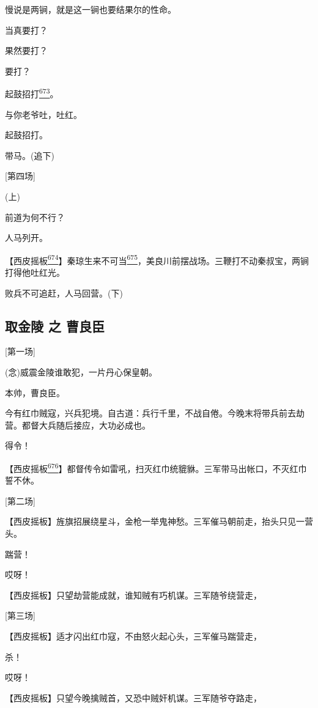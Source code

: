 慢说是两锏，就是这一锏也要结果尔的性命。

当真要打？

果然要打？

要打？

起鼓招打\protect\hyperlink{fn673}{\textsuperscript{673}}。

与你老爷吐，吐红。

起鼓招打。

带马。(追下)

{[}第四场{]}

(上)

前道为何不行？

人马列开。

【西皮摇板\protect\hyperlink{fn674}{\textsuperscript{674}}】秦琼生来不可当\protect\hyperlink{fn675}{\textsuperscript{675}}，美良川前摆战场。三鞭打不动秦叔宝，两锏打得他吐红光。

败兵不可追赶，人马回营。(下)

\newpage
\hypertarget{ux53d6ux91d1ux9675-ux4e4b-ux66f9ux826fux81e3}{%
\subsection{取金陵 之
曹良臣}\label{ux53d6ux91d1ux9675-ux4e4b-ux66f9ux826fux81e3}}

{[}第一场{]}

(念)威震金陵谁敢犯，一片丹心保皇朝。

本帅，曹良臣。

今有红巾贼寇，兴兵犯境。自古道：兵行千里，不战自倦。今晚末将带兵前去劫营。都督大兵随后接应，大功必成也。

得令！

【西皮摇板\protect\hyperlink{fn676}{\textsuperscript{676}}】都督传令如雷吼，扫灭红巾统貔貅。三军带马出帐口，不灭红巾誓不休。

{[}第二场{]}

【西皮摇板】旌旗招展绕星斗，金枪一举鬼神愁。三军催马朝前走，抬头只见一营头。

踹营！

哎呀！

【西皮摇板】只望劫营能成就，谁知贼有巧机谋。三军随爷绕营走，

{[}第三场{]}

【西皮摇板】适才闪出红巾寇，不由怒火起心头，三军催马踹营走，

杀！

哎呀！

【西皮摇板】只望今晚擒贼首，又恐中贼奸机谋。三军随爷夺路走，

